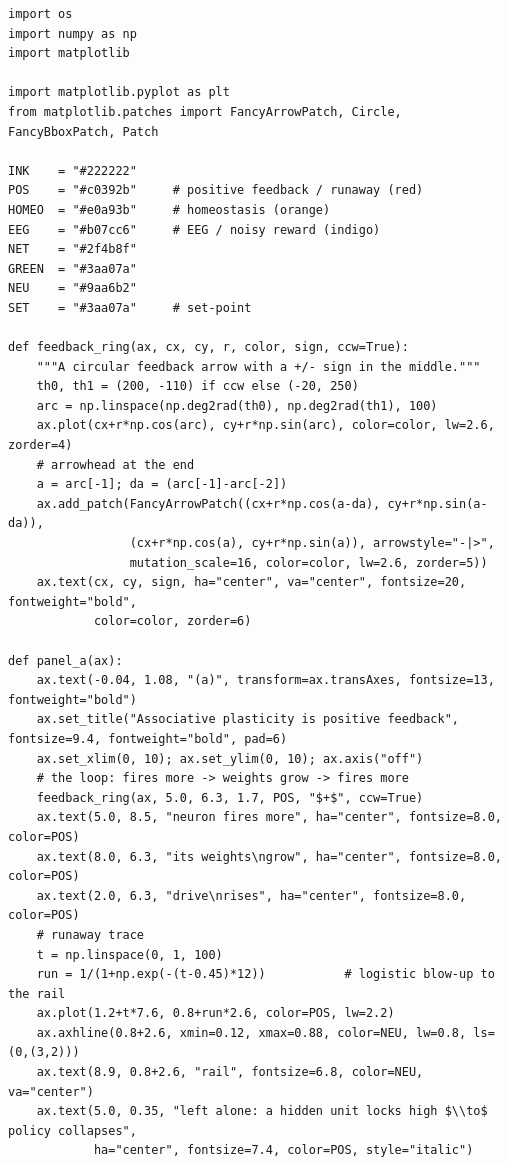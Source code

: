 \begin{lstlisting}[caption={schematics.ipynb code cell 9},label={lst:mrl-nb-schematics-9}]
import os
import numpy as np
import matplotlib

import matplotlib.pyplot as plt
from matplotlib.patches import FancyArrowPatch, Circle, FancyBboxPatch, Patch

INK    = "#222222"
POS    = "#c0392b"     # positive feedback / runaway (red)
HOMEO  = "#e0a93b"     # homeostasis (orange)
EEG    = "#b07cc6"     # EEG / noisy reward (indigo)
NET    = "#2f4b8f"
GREEN  = "#3aa07a"
NEU    = "#9aa6b2"
SET    = "#3aa07a"     # set-point

def feedback_ring(ax, cx, cy, r, color, sign, ccw=True):
    """A circular feedback arrow with a +/- sign in the middle."""
    th0, th1 = (200, -110) if ccw else (-20, 250)
    arc = np.linspace(np.deg2rad(th0), np.deg2rad(th1), 100)
    ax.plot(cx+r*np.cos(arc), cy+r*np.sin(arc), color=color, lw=2.6, zorder=4)
    # arrowhead at the end
    a = arc[-1]; da = (arc[-1]-arc[-2])
    ax.add_patch(FancyArrowPatch((cx+r*np.cos(a-da), cy+r*np.sin(a-da)),
                 (cx+r*np.cos(a), cy+r*np.sin(a)), arrowstyle="-|>",
                 mutation_scale=16, color=color, lw=2.6, zorder=5))
    ax.text(cx, cy, sign, ha="center", va="center", fontsize=20, fontweight="bold",
            color=color, zorder=6)

def panel_a(ax):
    ax.text(-0.04, 1.08, "(a)", transform=ax.transAxes, fontsize=13, fontweight="bold")
    ax.set_title("Associative plasticity is positive feedback", fontsize=9.4, fontweight="bold", pad=6)
    ax.set_xlim(0, 10); ax.set_ylim(0, 10); ax.axis("off")
    # the loop: fires more -> weights grow -> fires more
    feedback_ring(ax, 5.0, 6.3, 1.7, POS, "$+$", ccw=True)
    ax.text(5.0, 8.5, "neuron fires more", ha="center", fontsize=8.0, color=POS)
    ax.text(8.0, 6.3, "its weights\ngrow", ha="center", fontsize=8.0, color=POS)
    ax.text(2.0, 6.3, "drive\nrises", ha="center", fontsize=8.0, color=POS)
    # runaway trace
    t = np.linspace(0, 1, 100)
    run = 1/(1+np.exp(-(t-0.45)*12))           # logistic blow-up to the rail
    ax.plot(1.2+t*7.6, 0.8+run*2.6, color=POS, lw=2.2)
    ax.axhline(0.8+2.6, xmin=0.12, xmax=0.88, color=NEU, lw=0.8, ls=(0,(3,2)))
    ax.text(8.9, 0.8+2.6, "rail", fontsize=6.8, color=NEU, va="center")
    ax.text(5.0, 0.35, "left alone: a hidden unit locks high $\\to$ policy collapses",
            ha="center", fontsize=7.4, color=POS, style="italic")


\end{lstlisting}
